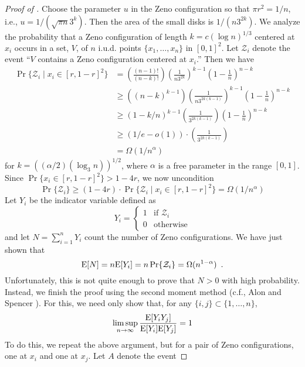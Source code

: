 \documentclass{patmorin}
\begin{document}
\begin{proof}[Proof of ]
Choose the parameter $u$ in the Zeno configuration so that $\pi r^2=1/n$,
i.e., $u=1/(\sqrt{\pi n}3^k)$.  Then the area of the small disks is
$1/(n3^{2k})$.
We analyze the probability that a Zeno configuration of length $k=c(\log
n)^{1/3}$ centered at $x_i$ occurs in a set, $V$, of $n$ i.u.d. points
$\{x_1,\ldots,x_n\}$ in
$[0,1]^2$.  Let $\mathcal{Z}_i$ denote the event ``$V$
contains a Zeno configuration centered at $x_i$.''  Then we have
\begin{align*}
 \Pr\{\mathcal{Z}_i\mid x_i\in[r,1-r]^2\} 
  & = \left(\frac{(n-1)!}{(n-k)!}\right) %
      \left(\frac{1}{n3^{2k}}\right)^{k-1}   %
      \left(1-\frac{1}{n}\right)^{n-k}   \\ %
  & \ge
      \left((n-k)^{k-1}\right) 
      \left(\frac{1}{n3^{2k(k-1)}}\right)^{k-1}  
      \left(1-\frac{1}{n}\right)^{n-k}   \\ 
  & \ge 
      (1-k/n)^{k-1} %
      \left(\frac{1}{3^{2k(k-1)}}\right)
      \left(1-\frac{1}{n}\right)^{n-k} \\
  & \ge (1/e-o(1)) \cdot \left(\frac{1}{3^{2k(k-1)}}\right) \\
  & = \Omega(1/n^{\alpha})
\end{align*}
for $k=((\alpha/2)(\log_3 n))^{1/2}$, where $\alpha$ is a free parameter in
the range $[0,1]$.  Since $\Pr\{x_i\in[r,1-r]^2\} > 1-4r$, we now
uncondition
\[
 \Pr\{\mathcal{Z}_i\} \ge  
    (1-4r)\cdot\Pr\{\mathcal{Z}_i\mid x_i\in[r,1-r]^2\}
    = \Omega(1/n^{\alpha})
\]
Let $Y_i$ be the indicator variable defined as
\[
   Y_i = \begin{cases} 1 & \text{if $\mathcal{Z}_i$} \\
                       0 & \text{otherwise} 
         \end{cases}
\]
and let $N=\sum_{i=1}^n Y_i$ count the number of Zeno configurations.  We
have just shown that 
\[
   \mathrm{E}[N] = n\mathrm{E}[Y_i] = n\Pr\{\mathcal{Z}_i\}=\Omega(n^{1-\alpha}) \enspace .
\]
Unfortunately, this is not quite enough to prove that $N>0$ with high
probability.  Instead, we finish the proof using the second moment method
(c.f., Alon and Spencer \cite[Chapter~4]{asXX}).  For this, we need only 
show that, for any $\{i,j\}\subset\{1,\ldots,n\}$,
\[
   \limsup_{n\rightarrow\infty}\frac{\mathrm{E}[Y_iY_j]}{\mathrm{E}[Y_i]\mathrm{E}[Y_j]} = 1
\]
To do this, we repeat the above argument, but for a pair of Zeno
configurations, one at $x_i$ and one at $x_j$.  Let $A$ denote the event

\end{proof}
\end{document}
